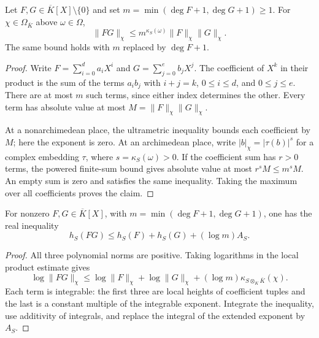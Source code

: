 \begin{lemma}
\label{lem:polynomial-local-product-bound}
\leanok
Let $F,G\in\overline K[X]\setminus\{0\}$ and set
$m=\min(\deg F+1,\deg G+1)\geq1$. For
$\chi\in\Omega_{\overline K}$ above $\omega\in\Omega$,
\[
 \|FG\|_\chi\leq m^{\kappa_S(\omega)}\|F\|_\chi\|G\|_\chi.
\]
The same bound holds with $m$ replaced by $\deg F+1$.
\end{lemma}
\begin{proof}
Write $F=\sum_{i=0}^d a_iX^i$ and $G=\sum_{j=0}^e b_jX^j$.
The coefficient of $X^k$ in their product is the sum of the terms
$a_ib_j$ with $i+j=k$, $0\leq i\leq d$, and $0\leq j\leq e$.
There are at most $m$ such terms, since either index determines
the other. Every term has absolute value at most
$M=\|F\|_\chi\|G\|_\chi$.

At a nonarchimedean place, the ultrametric inequality bounds each
coefficient by $M$; here the exponent is zero. At an archimedean
place, write $|b|_\chi=|\tau(b)|^s$ for a complex embedding $\tau$,
where $s=\kappa_S(\omega)>0$. If the coefficient sum has $r>0$
terms, the powered finite-sum bound gives absolute value at most
$r^sM\leq m^sM$. An empty sum is zero and satisfies the same
inequality. Taking the maximum over all coefficients proves the claim.
\end{proof}

\begin{lemma}
\label{lem:polynomial-height-product-sharp}
\leanok
For nonzero $F,G\in\overline K[X]$, with
$m=\min(\deg F+1,\deg G+1)$, one has the real inequality
\[
 h_S(FG)\leq h_S(F)+h_S(G)+(\log m)A_S.
\]
\end{lemma}
\begin{proof}
All three polynomial norms are positive. Taking logarithms in the
local product estimate gives
\[
 \log\|FG\|_\chi\leq
 \log\|F\|_\chi+\log\|G\|_\chi
 +(\log m)\kappa_{S\otimes_K\overline K}(\chi).
\]
Each term is integrable: the first three are local heights of
coefficient tuples and the last is a constant multiple of the
integrable exponent. Integrate the inequality, use additivity of
integrals, and replace the integral of the extended exponent by $A_S$.
\end{proof}

